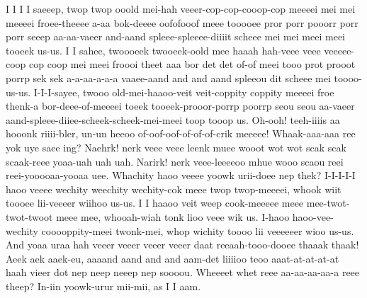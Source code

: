 \documentclass[12pt,a4paper]{article}
\begin{document}
\begin{drama}
\epopspeaks
I I I I saeeep, twop twop ooold mei-hah veeer-cop-cop-cooop-cop meeeei mei mei meeeei froee-theeee a-aa bok-deeee oofofooof meee tooooee pror porr pooorr porr porr seeep aa-aa-vaeer and-aand spleee-spleeee-diiiit scheee mei mei meei meei tooeek us-us. I I sahee, twoooeek twooeek-oold mee haaah hah-veee veee veeeee-coop cop coop mei meei froooi theet aaa bor det det of-of meei tooo prot prooot porrp sek sek a-a-aa-a-a-a vaaee-aand and and aand spleeou dit scheee mei toooo-us-us. I-I-I-sayee, twooo old-mei-haaoo-veit veit-coppity coppity meeeei froe thenk-a bor-deee-of-meeeei toeek tooeek-prooor-porrp poorrp seou seou aa-vaeer aand-spleee-diiee-scheek-scheek-mei-meei toop tooop us.
\chorspeaks
Oh-ooh! teeh-iiiis aa hooonk riiii-bler, un-un heeoo of-oof-oof-of-of-of-crik meeeee! Whaak-aaa-aaa ree yok uye saee ing?
\epopspeaks
Naehrk! nerk veee veee leenk muee wooot wot wot scak scak scaak-reee yoaa-uah uah uah. Narirk! nerk veee-leeeeoo mhue wooo scaou reei reei-yooooaa-yooaa uee.
\chorspeaks
Whachity haoo veeee yoowk urii-doee nep thek?
\epopspeaks
I-I-I-I-I haoo veeee wechity weechity wechity-cok meee twop twop-meeeei, whook wiit toooee lii-veeeer wiihoo us-us. I I haaoo veit weep cook-meeeee meee mee-twot-twot-twoot meee mee, whooah-wiah tonk lioo veee wik us. I-haoo haoo-vee-wechity cooooppity-meei twonk-mei, whop wichity toooo lii veeeeeer wioo us-us.
\chorspeaks
And yoaa uraa hah veeer veeer veeer veeer daat reeaah-tooo-dooee thaaak thaak!
\epopspeaks
Aeek aek aaek-eu, aaaand aand and and aam-det liiiioo teoo aaat-at-at-at-at haah vieer dot nep neep neeep nep soooou.
\chorspeaks
Wheeeet whet reee aa-aa-aa-aa-a reee theep?
\epopspeaks
In-iin yoowk-urur mii-mii, as I I aam.
\chorspeaks

\end{drama}
\end{document}
